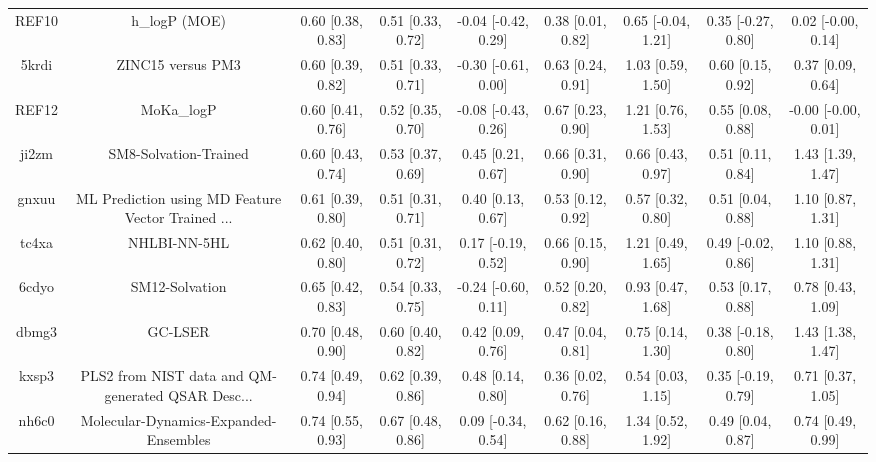 \documentclass{article}
\begin{document}
\begin{center}
\begin{longtable}{|ccccccccc|}
 REF10 &                                      h\_logP (MOE) &  0.60 [0.38, 0.83] &  0.51 [0.33, 0.72] &   -0.04 [-0.42, 0.29] &  0.38 [0.01, 0.82] &   0.65 [-0.04, 1.21] &   0.35 [-0.27, 0.80] &    0.02 [-0.00, 0.14] \\
 5krdi &                                  ZINC15 versus PM3 &  0.60 [0.39, 0.82] &  0.51 [0.33, 0.71] &   -0.30 [-0.61, 0.00] &  0.63 [0.24, 0.91] &    1.03 [0.59, 1.50] &    0.60 [0.15, 0.92] &     0.37 [0.09, 0.64] \\
 REF12 &                                         MoKa\_logP &  0.60 [0.41, 0.76] &  0.52 [0.35, 0.70] &   -0.08 [-0.43, 0.26] &  0.67 [0.23, 0.90] &    1.21 [0.76, 1.53] &    0.55 [0.08, 0.88] &   -0.00 [-0.00, 0.01] \\
 ji2zm &                              SM8-Solvation-Trained &  0.60 [0.43, 0.74] &  0.53 [0.37, 0.69] &     0.45 [0.21, 0.67] &  0.66 [0.31, 0.90] &    0.66 [0.43, 0.97] &    0.51 [0.11, 0.84] &     1.43 [1.39, 1.47] \\
 gnxuu &  ML Prediction using MD Feature Vector Trained ... &  0.61 [0.39, 0.80] &  0.51 [0.31, 0.71] &     0.40 [0.13, 0.67] &  0.53 [0.12, 0.92] &    0.57 [0.32, 0.80] &    0.51 [0.04, 0.88] &     1.10 [0.87, 1.31] \\
 tc4xa &                                       NHLBI-NN-5HL &  0.62 [0.40, 0.80] &  0.51 [0.31, 0.72] &    0.17 [-0.19, 0.52] &  0.66 [0.15, 0.90] &    1.21 [0.49, 1.65] &   0.49 [-0.02, 0.86] &     1.10 [0.88, 1.31] \\
 6cdyo &                                     SM12-Solvation &  0.65 [0.42, 0.83] &  0.54 [0.33, 0.75] &   -0.24 [-0.60, 0.11] &  0.52 [0.20, 0.82] &    0.93 [0.47, 1.68] &    0.53 [0.17, 0.88] &     0.78 [0.43, 1.09] \\
 dbmg3 &                                            GC-LSER &  0.70 [0.48, 0.90] &  0.60 [0.40, 0.82] &     0.42 [0.09, 0.76] &  0.47 [0.04, 0.81] &    0.75 [0.14, 1.30] &   0.38 [-0.18, 0.80] &     1.43 [1.38, 1.47] \\
 kxsp3 &  PLS2 from NIST data and QM-generated QSAR Desc... &  0.74 [0.49, 0.94] &  0.62 [0.39, 0.86] &     0.48 [0.14, 0.80] &  0.36 [0.02, 0.76] &    0.54 [0.03, 1.15] &   0.35 [-0.19, 0.79] &     0.71 [0.37, 1.05] \\
 nh6c0 &              Molecular-Dynamics-Expanded-Ensembles &  0.74 [0.55, 0.93] &  0.67 [0.48, 0.86] &    0.09 [-0.34, 0.54] &  0.62 [0.16, 0.88] &    1.34 [0.52, 1.92] &    0.49 [0.04, 0.87] &     0.74 [0.49, 0.99] \\

\end{longtable}
\end{center}
\end{document}
